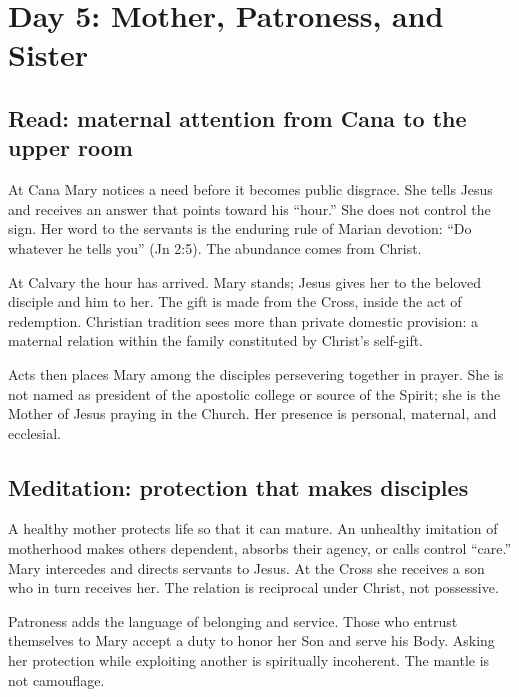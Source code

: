 \section{Day 5: Mother, Patroness, and Sister}


\subsection{Read: maternal attention from Cana to the upper room}

At Cana Mary notices a need before it becomes public disgrace. She tells Jesus and receives an answer that points toward his ``hour.'' She does not control the sign. Her word to the servants is the enduring rule of Marian devotion: ``Do whatever he tells you'' (Jn 2:5). The abundance comes from Christ.

At Calvary the hour has arrived. Mary stands; Jesus gives her to the beloved disciple and him to her. The gift is made from the Cross, inside the act of redemption. Christian tradition sees more than private domestic provision: a maternal relation within the family constituted by Christ's self-gift.

Acts then places Mary among the disciples persevering together in prayer. She is not named as president of the apostolic college or source of the Spirit; she is the Mother of Jesus praying in the Church. Her presence is personal, maternal, and ecclesial.

\subsection{Meditation: protection that makes disciples}

A healthy mother protects life so that it can mature. An unhealthy imitation of motherhood makes others dependent, absorbs their agency, or calls control ``care.'' Mary intercedes and directs servants to Jesus. At the Cross she receives a son who in turn receives her. The relation is reciprocal under Christ, not possessive.

Patroness adds the language of belonging and service. Those who entrust themselves to Mary accept a duty to honor her Son and serve his Body. Asking her protection while exploiting another is spiritually incoherent. The mantle is not camouflage.

